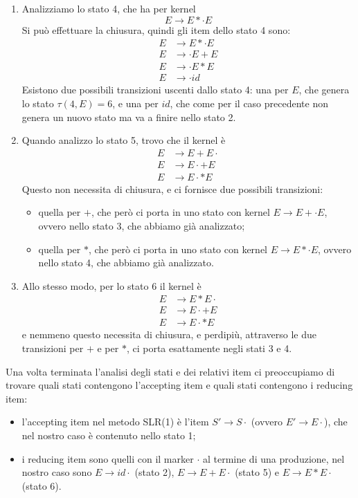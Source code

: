 \documentclass[class=book, crop=false, oneside, 12pt]{standalone}
\begin{document}
\begin{enumerate}
    \item Analizziamo lo stato 4, che ha per kernel
    \begin{equation*}
        E \to E*\cdot E 
    \end{equation*}
    Si può effettuare la chiusura, quindi gli item dello stato 4 sono:
    \begin{align*}
        E &\to E*\cdot E \\ 
        E &\to \cdot E+E \\
        E &\to \cdot E*E \\
        E &\to \cdot id
    \end{align*}
    Esistono due possibili transizioni uscenti dallo stato 4: una per \(E\), che genera lo stato \(\tau(4,E)=6\), e una per \(id\), che come per il caso precedente non genera un nuovo stato ma va a finire nello stato 2.
    \item Quando analizzo lo stato 5, trovo che il kernel è
    \begin{align*}
        E &\to E+E\cdot  \\
        E &\to E\cdot +E \\
        E &\to E\cdot *E
    \end{align*}
    Questo non necessita di chiusura, e ci fornisce due possibili transizioni:
    \begin{itemize}
        \item quella per \(+\), che però ci porta in uno stato con kernel \({E \to E + \cdot E}\), ovvero nello stato 3, che abbiamo già analizzato;
        \item quella per \(*\), che però ci porta in uno stato con kernel \({E \to E * \cdot E}\), ovvero nello stato 4, che abbiamo già analizzato.
    \end{itemize}
    \item Allo stesso modo, per lo stato 6 il kernel è
    \begin{align*}
        E &\to E*E\cdot  \\
        E &\to E\cdot +E \\
        E &\to E\cdot *E
    \end{align*}
    e nemmeno questo necessita di chiusura, e perdipiù, attraverso le due transizioni per \(+\) e per \(*\), ci porta esattamente negli stati 3 e 4.
\end{enumerate}
Una volta terminata l'analisi degli stati e dei relativi item ci preoccupiamo di trovare quali stati contengono l'accepting item e quali stati contengono i reducing item:
\begin{itemize}
    \item l'accepting item nel metodo SLR(1) è l'item \(S' \to S\cdot \) (ovvero \(E' \to E\cdot \)), che nel nostro caso è contenuto nello stato 1;
    \item i reducing item sono quelli con il marker \(\cdot\) al termine di una produzione, nel nostro caso sono \(E \to id \cdot\) (stato 2), \(E \to E+E \cdot\) (stato 5) e \(E \to E*E \cdot\) (stato 6).
\end{itemize}
\end{document}
